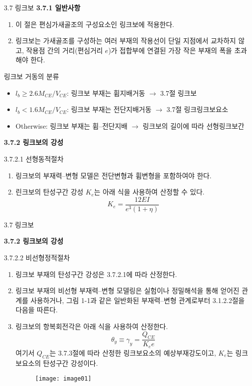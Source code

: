 
	\begin{frame}{3.7 링크보}
	\textbf{3.7.1 일반사항}
	
	\begin{enumerate}
		\item[(1)] 이 절은 편심가새골조의 구성요소인 링크보에 적용한다. 
		\item[(2)] 링크보는 가새골조를 구성하는 여러 부재의 작용선이 단일 지점에서 교차하지 않고, 작용점 간의 거리(편심거리 $e$)가 접합부에 연결된 가장 작은 부재의 폭을 초과해야 한다. 
	\end{enumerate}
		
	\begin{block}{링크보 거동의 분류}
		\begin{itemize}
			\item $l_b \geq 2.6M_{CE}/V_{CE}$: 링크보 부재는 휨지배거동 $\rightarrow$ 3.7절 링크보
			\item $l_b < 1.6M_{CE}/V_{CE}$: 링크보 부재는 전단지배거동 $\rightarrow$ 3.7절 링크링크보요소
			\item Otherwise: 링크보 부재는 휨--전단지배 $\rightarrow$ 링크보의 길이에 따라 선형링크보간
		\end{itemize}
	\end{block}

	\textbf{3.7.2 링크보의 강성}
	
	3.7.2.1 선형동적절차
	
	\begin{enumerate}
		\item[(1)] 링크보의 부재력--변형 모델은 전단변형과 휨변형을 포함하여야 한다. 
		\item[(2)] 린크보의 탄성구간 강성 $K_e$는 아래 식을 사용하여 산정할 수 있다. 
		\[K_e = \frac{12EI}{e^3(1+\eta)}\]
	\end{enumerate}		
	
	\end{frame}


	\begin{frame}{3.7 링크보}

	\textbf{3.7.2 링크보의 강성}
	
	3.7.2.2 비선형정적절차
	
	\begin{enumerate}
		\item[(1)] 링크보 부재의 탄성구간 강성은 3.7.2.1에 따라 산정한다.
		\item[(2)] 링크보 부재의 비선형 부재력--변형 모델링은 실험이나 정밀해석을 통해 얻어진 관계를 사용하거나, 그림 1-1과 같은 일반화된 부재력--변형 관계로부터 3.1.2.2절을 다음을 따른다.
		\item[(3)] 링크보의 항복회전각은 아래 식을 사용하여 산정한다. 
		\[\theta_y \equiv \gamma_y = \frac{Q_{CE}}{K_e e}\] 
		\noindent 여기서 $Q_{CE}$는 3.7.3절에 따라 산정한 링크보요소의 예상부재강도이고, $K_e$는 링크보요소의 탄성구간 강성이다. 
		\begin{figure}
			\centering
			\texttt{[image: image01]}
		\end{figure}
	\end{enumerate}
	\end{frame}
	
